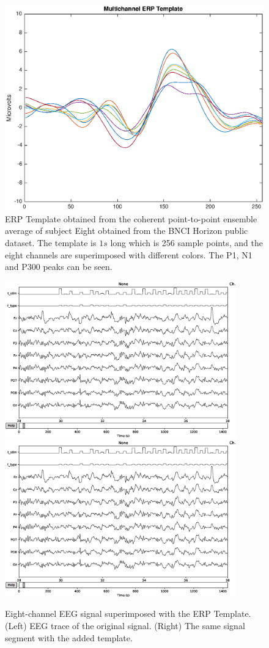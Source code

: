 \documentclass[brainsci,article,submit,moreauthors,pdftex,10pt,a4paper]{mdpi}
\begin{document}
\begin{figure}[H]
\centering
\includegraphics[width=12cm]{images/erptemplate1.eps}
\caption{ERP Template obtained from the coherent point-to-point ensemble average of subject Eight obtained from the BNCI Horizon public dataset. The template is $1s$ long which is 256 sample points, and the eight channels are superimposed with different colors.  The P1, N1 and P300 peaks can be seen.}
\label{fig:erptemplate1}
\end{figure}

\begin{figure}[H]
\centering
\includegraphics[width=10cm]{images/doublegain.eps}
\includegraphics[width=10cm]{images/triplegain.eps}
\caption{Eight-channel EEG signal superimposed with the ERP Template.  (Left) EEG trace of the original signal. (Right) The same signal segment with the added template.}
\label{fig:doubleandtriplegain}
\end{figure}
\end{document}
